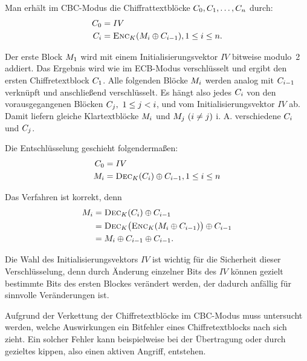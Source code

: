 Man erhält im CBC-Modus die Chiffrattextblöcke $C_0, C_1, \ldots, C_n$ durch:
\begin{align*}
	C_0 &= IV\\
	C_i &= \textsc{Enc}_{K}(M_i \oplus C_{i-1}){,}\, 1 \leq i \leq n.
\end{align*}

Der erste Block $M_1$ wird mit einem Initialisierungsvektor $IV$ bitweise modulo~2 addiert. Das Ergebnis wird wie im ECB-Modus verschlüsselt und ergibt den ersten Chiffretextblock $C_1$.
Alle folgenden Blöcke $M_i$ werden analog mit $C_{i-1}$ verknüpft und anschließend verschlüsselt. 
Es hängt also jedes $C_i$ von den vorausgegangenen Blöcken $C_j,\ 1\leq j<i$, und vom Initialisierungsvektor $IV$ ab. Damit
liefern gleiche Klartextblöcke $M_i$ und $M_j\ (i\neq j)$ i. A. verschiedene $C_i$ und $C_j$.

Die Entschlüsselung geschieht folgendermaßen:
\begin{align*}
	C_0 &= IV\\
	M_i &= \textsc{Dec}_{K}(C_i)\oplus C_{i-1}{,}\, 1 \leq i \leq n
\end{align*}

Das Verfahren ist korrekt, denn
\begin{align*}
	\begin{split}
		M_i &= \textsc{Dec}_{K}(C_i)\oplus C_{i-1}\\
		&= \textsc{Dec}_{K} \bigl(\textsc{Enc}_{K}(M_i\oplus C_{i-1})\bigr) \oplus C_{i-1}\\
		&= M_i\oplus C_{i-1}\oplus C_{i-1}.
	\end{split}
\end{align*}

Die Wahl des Initialisierungsvektors $IV$ ist wichtig für die Sicherheit dieser Verschlüsselung, denn durch Änderung einzelner Bits des $IV$ können gezielt
bestimmte Bits des ersten Blockes verändert werden, der dadurch anfällig für sinnvolle Veränderungen ist.

Aufgrund der Verkettung der Chiffretextblöcke im CBC-Modus muss untersucht werden, welche Auswirkungen ein Bitfehler eines Chiffretextblocks nach sich zieht.
Ein solcher Fehler kann beispielweise bei der Übertragung oder durch gezieltes kippen, also einen aktiven Angriff, entstehen.

